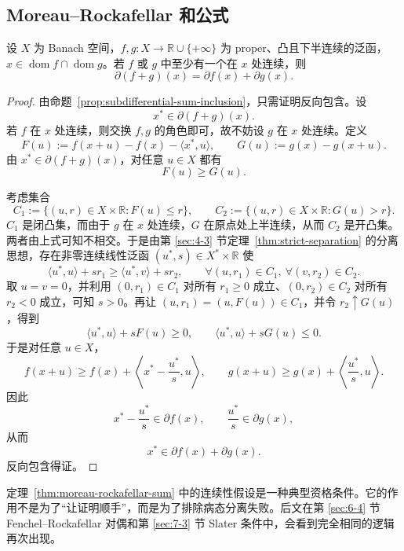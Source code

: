 \subsection{Moreau--Rockafellar 和公式}

\begin{theorem}\label{thm:moreau-rockafellar-sum}
设 $X$ 为 Banach 空间，$f,g\colon X\to \mathbb R\cup\{+\infty\}$ 为 proper、凸且下半连续的泛函，$x\in \operatorname{dom}f\cap \operatorname{dom}g$。若 $f$ 或 $g$ 中至少有一个在 $x$ 处连续，则
\[
\partial (f+g)(x)=\partial f(x)+\partial g(x).
\]
\end{theorem}

\begin{proof}
由命题~\ref{prop:subdifferential-sum-inclusion}，只需证明反向包含。设
\[
x^\ast\in \partial (f+g)(x).
\]
若 $f$ 在 $x$ 处连续，则交换 $f,g$ 的角色即可，故不妨设 $g$ 在 $x$ 处连续。定义
\[
F(u):=f(x+u)-f(x)-\langle x^\ast,u\rangle,
\qquad
G(u):=g(x)-g(x+u).
\]
由 $x^\ast\in\partial(f+g)(x)$，对任意 $u\in X$ 都有
\[
F(u)\ge G(u).
\]

考虑集合
\[
C_1:=\{(u,r)\in X\times\mathbb R:F(u)\le r\},
\qquad
C_2:=\{(u,r)\in X\times\mathbb R:G(u)>r\}.
\]
$C_1$ 是闭凸集，而由于 $g$ 在 $x$ 处连续，$G$ 在原点处上半连续，从而 $C_2$ 是开凸集。两者由上式可知不相交。于是由第 \ref{sec:4-3} 节定理~\ref{thm:strict-separation} 的分离思想，存在非零连续线性泛函 $(u^\ast,s)\in X^\ast\times\mathbb R$ 使
\[
\langle u^\ast,u\rangle + sr_1 \ge \langle u^\ast,v\rangle + sr_2,
\qquad
\forall (u,r_1)\in C_1,\ \forall (v,r_2)\in C_2.
\]
取 $u=v=0$，并利用 $(0,r_1)\in C_1$ 对所有 $r_1\ge 0$ 成立、$(0,r_2)\in C_2$ 对所有 $r_2<0$ 成立，可知 $s>0$。再让 $(u,r_1)=(u,F(u))\in C_1$，并令 $r_2\uparrow G(u)$，得到
\[
\langle u^\ast,u\rangle + sF(u)\ge 0,\qquad
\langle u^\ast,u\rangle + sG(u)\le 0.
\]
于是对任意 $u\in X$，
\[
f(x+u)\ge f(x)+\left\langle x^\ast-\frac{u^\ast}{s},u\right\rangle,
\qquad
g(x+u)\ge g(x)+\left\langle \frac{u^\ast}{s},u\right\rangle.
\]
因此
\[
x^\ast-\frac{u^\ast}{s}\in \partial f(x),
\qquad
\frac{u^\ast}{s}\in \partial g(x),
\]
从而
\[
x^\ast\in \partial f(x)+\partial g(x).
\]
反向包含得证。
\end{proof}

\begin{remark}
定理~\ref{thm:moreau-rockafellar-sum} 中的连续性假设是一种典型资格条件。它的作用不是为了“让证明顺手”，而是为了排除病态分离失败。后文在第 \ref{sec:6-4} 节 Fenchel--Rockafellar 对偶和第 \ref{sec:7-3} 节 Slater 条件中，会看到完全相同的逻辑再次出现。
\end{remark}

